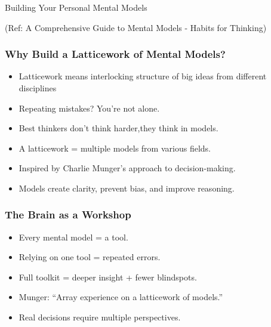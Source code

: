 \begin{frame}[fragile]\frametitle{}
\begin{center}
{\Large Building Your Personal Mental Models}

{\tiny (Ref: A Comprehensive Guide to Mental Models - Habits for Thinking)}

\end{center}
\end{frame}


\begin{frame}[fragile]\frametitle{Why Build a Latticework of Mental Models?}
  \begin{itemize}
	\item Latticework means interlocking structure of big ideas from different disciplines 
    \item Repeating mistakes? You're not alone.
    \item Best thinkers don't think harder,they think in models.
    \item A latticework = multiple models from various fields.
    \item Inspired by Charlie Munger's approach to decision-making.
    \item Models create clarity, prevent bias, and improve reasoning.
  \end{itemize}
\end{frame}

\begin{frame}[fragile]\frametitle{The Brain as a Workshop}
  \begin{itemize}
    \item Every mental model = a tool.
    \item Relying on one tool = repeated errors.
    \item Full toolkit = deeper insight + fewer blindspots.
    \item Munger: ``Array experience on a latticework of models.''
    \item Real decisions require multiple perspectives.
  \end{itemize}
\end{frame}

